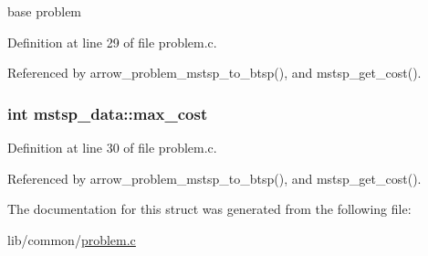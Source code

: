 base problem 

Definition at line 29 of file problem.c.

Referenced by arrow\_\-problem\_\-mstsp\_\-to\_\-btsp(), and mstsp\_\-get\_\-cost().\hypertarget{structmstsp__data_d67e756e8301f873f3b4d2f58b848380}{
\subsubsection[{max\_\-cost}]{\setlength{\rightskip}{0pt plus 5cm}int {\bf mstsp\_\-data::max\_\-cost}}}
\label{structmstsp__data_d67e756e8301f873f3b4d2f58b848380}




Definition at line 30 of file problem.c.

Referenced by arrow\_\-problem\_\-mstsp\_\-to\_\-btsp(), and mstsp\_\-get\_\-cost().

The documentation for this struct was generated from the following file:\begin{CompactItemize}
\item 
lib/common/\hyperlink{problem_8c}{problem.c}\end{CompactItemize}
